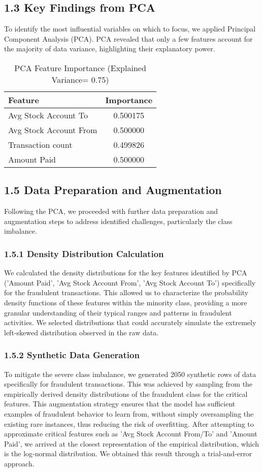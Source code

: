 \documentclass[11pt,twoside,twocolumn]{extarticle}
\begin{document}
\subsection*{1.3 Key Findings from PCA}
To identify the most influential variables on which to focus, we applied Principal Component Analysis (PCA). PCA revealed that only a few features account for the majority of data variance, highlighting their explanatory power.

\begin{table}[h]
\centering
\caption{PCA Feature Importance (Explained Variance= 0.75)}
\begin{tabular}{lc}
\toprule
\textbf{Feature} & \textbf{Importance} \\
\midrule
Avg Stock Account To & 0.500175 \\
Avg Stock Account From & 0.500000 \\
Transaction count & 0.499826 \\
Amount Paid & 0.500000 \\
\bottomrule
\end{tabular}
\end{table}

\subsection*{1.5 Data Preparation and Augmentation}
Following the PCA, we proceeded with further data preparation and augmentation steps to address identified challenges, particularly the class imbalance.

\subsubsection*{1.5.1 Density Distribution Calculation}
We calculated the density distributions for the key features identified by PCA ('Amount Paid', 'Avg Stock Account From', 'Avg Stock Account To') specifically for the fraudulent transactions. This allowed us to characterize the probability density functions of these features within the minority class, providing a more granular understanding of their typical ranges and patterns in fraudulent activities.
We selected distributions that could accurately simulate the extremely left‑skewed distribution observed in the raw data.

\subsubsection*{1.5.2 Synthetic Data Generation}
To mitigate the severe class imbalance, we generated 2050 synthetic rows of data specifically for fraudulent transactions. This was achieved by sampling from the empirically derived density distributions of the fraudulent class for the critical features. This augmentation strategy ensures that the model has sufficient examples of fraudulent behavior to learn from, without simply oversampling the existing rare instances, thus reducing the risk of overfitting. After attempting to approximate critical features such as 'Avg Stock Account From/To' and 'Amount Paid', we arrived at the closest representation of the empirical distribution, which is the log‑normal distribution. We obtained this result through a trial‑and‑error approach.
\end{document}
